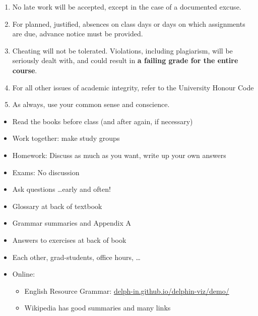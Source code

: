 \documentclass[a4paper,landscape,headrule,footrule]{foils}
\begin{document}
\begin{enumerate}
\item No late work will be accepted, except in the case of a documented excuse.
\item For planned, justified, absences on class days or days on which assignments are due, advance notice must be provided.
\item Cheating will not be tolerated. Violations, including plagiarism, will be seriously dealt with, and could result in \textbf{a failing grade for the entire course}.
\item For all other issues of academic integrity, refer to the University Honour Code
\item As always, use your common sense and conscience.
\end{enumerate}



\begin{itemize}
\item Read the books before class (and after again, if necessary)
\item Work together: make study groups
\item Homework: Discuss as much as you want, write up your own answers
\item Exams: No discussion
\item Ask questions \ldots  early and often!
\end{itemize}

\begin{itemize}
\item Glossary at back of textbook
\item Grammar summaries and Appendix A
\item Answers to exercises at back of book
\item Each other, grad-students,  office hours, \ldots
\item Online:
  \begin{itemize}
  \item English Resource Grammar: \href{https://delph-in.github.io/delphin-viz/demo/}{delph-in.github.io/delphin-viz/demo/}
  \item Wikipedia has good summaries and many links
  \end{itemize}
\end{itemize}
\end{document}
